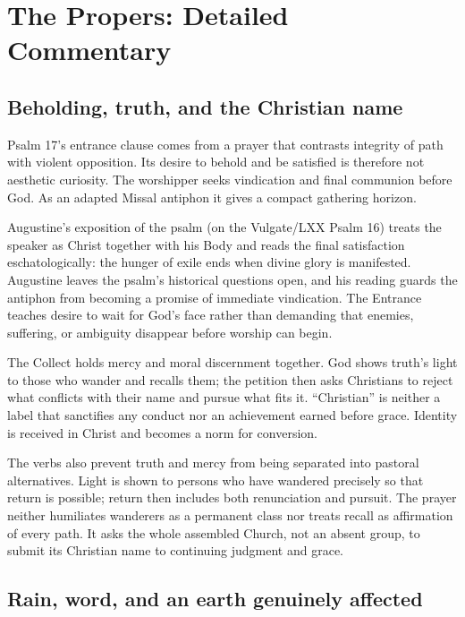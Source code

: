 \section*{The Propers: Detailed Commentary}

\subsection*{Beholding, truth, and the Christian name\enspace{}}

Psalm 17's entrance clause comes from a prayer that contrasts integrity of path with violent opposition. Its desire to behold and be satisfied is therefore not aesthetic curiosity. The worshipper seeks vindication and final communion before God. As an adapted Missal antiphon it gives a compact gathering horizon.

Augustine's exposition of the psalm (on the Vulgate/LXX Psalm 16) treats the speaker as Christ together with his Body and reads the final satisfaction eschatologically: the hunger of exile ends when divine glory is manifested. Augustine leaves the psalm's historical questions open, and his reading guards the antiphon from becoming a promise of immediate vindication. The Entrance teaches desire to wait for God's face rather than demanding that enemies, suffering, or ambiguity disappear before worship can begin.

The Collect holds mercy and moral discernment together. God shows truth's light to those who wander and recalls them; the petition then asks Christians to reject what conflicts with their name and pursue what fits it. “Christian” is neither a label that sanctifies any conduct nor an achievement earned before grace. Identity is received in Christ and becomes a norm for conversion.

The verbs also prevent truth and mercy from being separated into pastoral alternatives. Light is shown to persons who have wandered precisely so that return is possible; return then includes both renunciation and pursuit. The prayer neither humiliates wanderers as a permanent class nor treats recall as affirmation of every path. It asks the whole assembled Church, not an absent group, to submit its Christian name to continuing judgment and grace.

\subsection*{Rain, word, and an earth genuinely affected\enspace{}}


